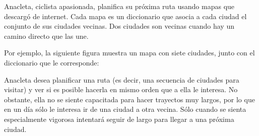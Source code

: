 Anacleta, ciclista apasionada,
planifica su próxima ruta
usando mapas que descargó de internet.
Cada mapa es un diccionario
que asocia a cada ciudad
el conjunto de sus ciudades vecinas.
Dos ciudades son vecinas
cuando hay un camino directo que las une.

Por ejemplo,
la siguiente figura muestra un mapa con siete ciudades,
junto con el diccionario que le corresponde:

\begin{minipage}[T]{.45\textwidth}
\end{minipage}
\hfil
\begin{minipage}[T]{.45\textwidth}
  
\end{minipage}

Anacleta desea planificar una ruta
(es decir, una secuencia de ciudades para visitar)
y ver si es posible hacerla en mismo orden que a ella le interesa.
No obstante,
ella no se siente capacitada para hacer trayectos muy largos,
por lo que en un día sólo le interesa ir de una ciudad a otra vecina.
Sólo cuando se sienta especialmente vigorosa
intentará seguir de largo para llegar a una próxima ciudad.

